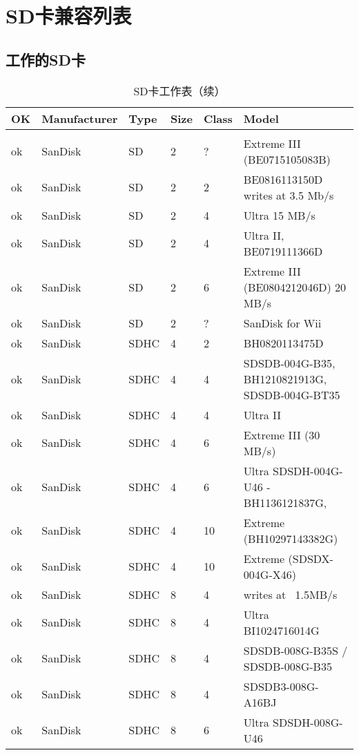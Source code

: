 \chapter{SD卡兼容列表}

\section{工作的SD卡}
\label{sec:sdcard}


\begin{longtable}{llllp{}p{}}
  \caption{SD卡工作表}\\\hline
  OK&Manufacturer&Type&Size&Class&Model\\\hline\endfirsthead
  \caption[]{SD卡工作表（续）}\\\hline\endhead
  ok&SanDisk&SD&2&?&Extreme III (BE0715105083B)\\
  ok&SanDisk&SD&2&2&BE0816113150D writes at 3.5 Mb/s\\
  ok&SanDisk&SD&2&4&Ultra	15 MB/s\\
  ok&SanDisk&SD&2&4&Ultra II, BE0719111366D\\
  ok&SanDisk&SD&2&6&Extreme III (BE0804212046D)	20 MB/s\\
  ok&SanDisk&SD&2&?&	SanDisk for Wii\\
  ok&SanDisk&SDHC&4&2&BH0820113475D\\
  ok&SanDisk&SDHC&4&4&SDSDB-004G-B35, BH1210821913G, SDSDB-004G-BT35\\
  ok&SanDisk&SDHC&4&4&Ultra II\\
  ok&SanDisk&SDHC&4&6&Extreme III (30 MB/s)\\
  ok&SanDisk&SDHC&4&6&Ultra SDSDH-004G-U46 - BH1136121837G,\\
  ok&SanDisk&SDHC&4&10&Extreme (BH10297143382G)\\
  ok&SanDisk&SDHC&4&10&Extreme (SDSDX-004G-X46)\\
  ok&SanDisk&SDHC&8&4&writes at ~1.5MB/s\\
  ok&SanDisk&SDHC&8&4&Ultra BI1024716014G\\
  ok&SanDisk&SDHC&8&4&SDSDB-008G-B35S / SDSDB-008G-B35\\
  ok&SanDisk&SDHC&8&4&SDSDB3-008G-A16BJ\\
  ok&SanDisk&SDHC&8&6&Ultra SDSDH-008G-U46\\

\end{longtable}
